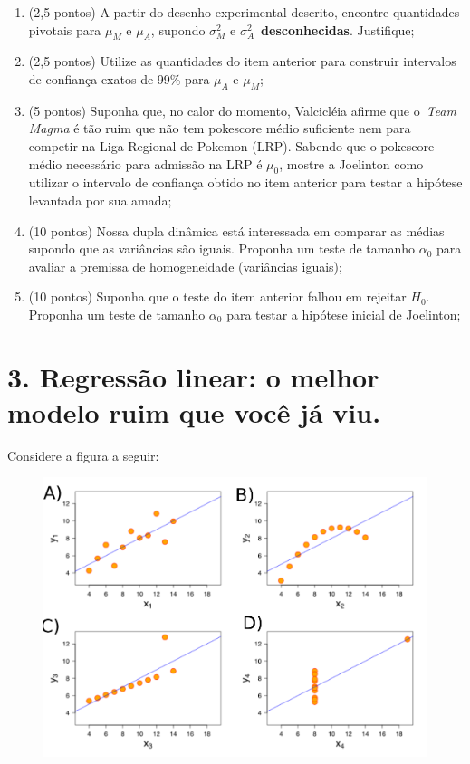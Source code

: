 \documentclass[a4paper,10pt, notitlepage]{report}
\begin{document}
\begin{enumerate}[label=\alph*)]
 \item (2,5 pontos) A partir do desenho experimental descrito, encontre quantidades pivotais para $\mu_M$ e $\mu_A$, supondo $\sigma_M^2$ e $\sigma_A^2$~\textbf{desconhecidas}. 
 Justifique;
 \item (2,5 pontos) Utilize as quantidades do item anterior para construir intervalos de confiança exatos de 99\% para $\mu_A$ e $\mu_M$;
  \item (5 pontos) Suponha que, no calor do momento, Valcicléia afirme que o~\textit{Team Magma} é tão ruim que não tem pokescore médio suficiente nem para competir na Liga Regional de Pokemon (LRP).
  Sabendo que o pokescore médio necessário para admissão na LRP é $\mu_0$, mostre a Joelinton como utilizar o intervalo de confiança obtido no item anterior para testar a hipótese levantada por sua amada;
 \item (10 pontos) Nossa dupla dinâmica está interessada em comparar as médias supondo que as variâncias são iguais.
 Proponha um teste de tamanho $\alpha_0$ para avaliar a premissa de homogeneidade (variâncias iguais);
 \item (10 pontos) Suponha que o teste do item anterior falhou em rejeitar $H_0$.
 Proponha um teste de tamanho $\alpha_0$ para testar a hipótese inicial de Joelinton;
\end{enumerate}

\newpage
\section*{3. Regressão linear: o melhor modelo ruim que você já viu.}

Considere a figura a seguir:
 \begin{figure}[H]
  \begin{center}
    \includegraphics[scale=.65]{../slides/figures/anscombe_mod.pdf}
  \end{center}
   \end{figure}
\end{document}
